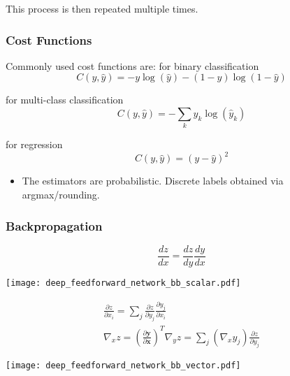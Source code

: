 This process is then repeated multiple times.

\subsubsection{Cost Functions}
Commonly used cost functions are:
\newpar{}
 for binary classification
\begin{equation*}
    C(y,\hat{y}) = -y\log(\hat{y})-(1-y)\log(1-\hat{y})
\end{equation*}

\newpar{}
 for multi-class classification
\begin{equation*}
    C(y,\hat{y}) = - \sum_{k}y_k\log(\hat{y}_k)
\end{equation*}

\newpar{}
 for regression
\begin{equation*}
    C(y,\hat{y}) = {(y - \hat{y})}^2
\end{equation*}

\newpar{}
\begin{itemize}
    \item The estimators are probabilistic. Discrete labels obtained via argmax/rounding.
\end{itemize}

\subsubsection{Backpropagation}

\begin{equation*}
    \frac{dz}{dx} = \frac{dz}{dy}\frac{dy}{dx}
\end{equation*}

\begin{center}
    \texttt{[image: deep\_feedforward\_network\_bb\_scalar.pdf]}
\end{center}

\begin{gather*}
    \frac{\partial z}{\partial x_i} = \sum_{j}\frac{\partial z}{\partial y_j}\frac{\partial y_j}{\partial x_i} \\
    \nabla_x z = {\left(\frac{\partial \mathbf{y}}{\partial \mathbf{x}}\right)}^T \nabla_y z = \sum_{j}(\nabla_x y_j)\frac{\partial z}{\partial y_j}
\end{gather*}

\begin{center}
    \texttt{[image: deep\_feedforward\_network\_bb\_vector.pdf]}
\end{center}

